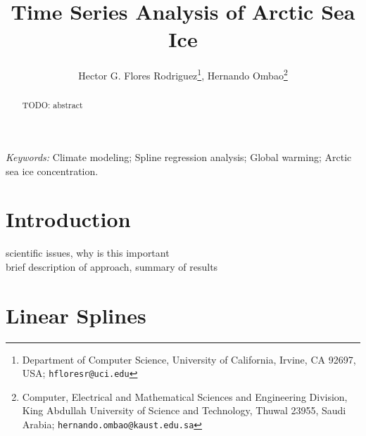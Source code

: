 \documentclass[12pt]{article}
\begin{document}
\date{}
\def\spacingset#1{\renewcommand{\baselinestretch}%
{#1}\small\normalsize} \spacingset{1}


\title{\bf Time Series Analysis of Arctic Sea Ice}
\author{Hector G. Flores Rodriguez\footnote{Department of Computer Science, University of California, Irvine, CA 92697, USA; \texttt{hfloresr@uci.edu}}, Hernando Ombao\footnote{Computer, Electrical and Mathematical Sciences and Engineering Division, King Abdullah University of Science and Technology, Thuwal 23955, Saudi Arabia; \texttt{hernando.ombao@kaust.edu.sa}}}
\maketitle


\bigskip
\begin{abstract}
TODO: abstract
\end{abstract}

\noindent%
{\it Keywords:}  Climate modeling; Spline regression analysis; Global warming; Arctic sea ice concentration.
\vfill


\newpage
\spacingset{2} %
\section{Introduction}

scientific issues, why is this important\\
brief description of approach, summary of results


\section{Linear Splines}
\end{document}
